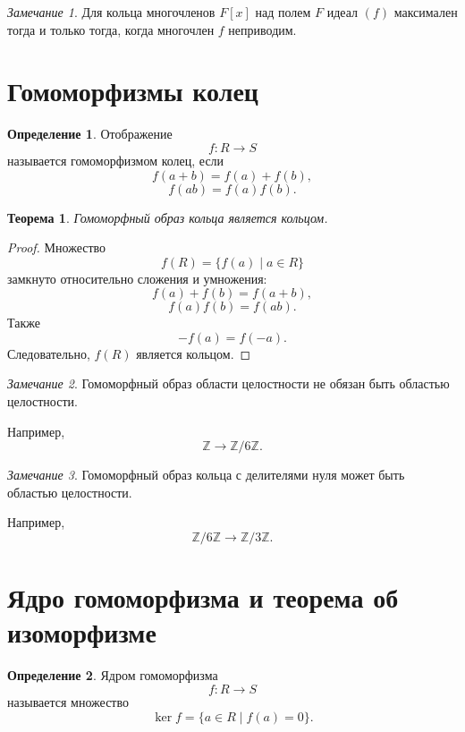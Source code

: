 \documentclass[12pt, a4paper]{article}
\newtheorem{theorem}{Теорема}
\theoremstyle{definition}
\newtheorem{definition}{Определение}
\theoremstyle{remark}
\newtheorem*{remark}{Замечание}
\newcommand{\Z}{\mathbb{Z}}
\begin{document}
\begin{remark}
	Для кольца многочленов $F[x]$ над полем $F$ идеал $(f)$ максимален тогда и только тогда, когда многочлен $f$ неприводим.
\end{remark}

\section{Гомоморфизмы колец}

\begin{definition}
	Отображение
	\[
	f:R\to S
	\]
	называется гомоморфизмом колец, если
	\[
	f(a+b)=f(a)+f(b),
	\]
	\[
	f(ab)=f(a)f(b).
	\]
\end{definition}

\begin{theorem}
	Гомоморфный образ кольца является кольцом.
\end{theorem}

\begin{proof}
	Множество
	\[
	f(R)=\{f(a)\mid a\in R\}
	\]
	замкнуто относительно сложения и умножения:
	\[
	f(a)+f(b)=f(a+b),
	\]
	\[
	f(a)f(b)=f(ab).
	\]
	Также
	\[
	-f(a)=f(-a).
	\]
	Следовательно, $f(R)$ является кольцом.
\end{proof}

\begin{remark}
	Гомоморфный образ области целостности не обязан быть областью целостности.
	
	Например,
	\[
	\Z\to \Z/6\Z.
	\]
\end{remark}

\begin{remark}
	Гомоморфный образ кольца с делителями нуля может быть областью целостности.
	
	Например,
	\[
	\Z/6\Z \to \Z/3\Z.
	\]
\end{remark}

\section{Ядро гомоморфизма и теорема об изоморфизме}

\begin{definition}
	Ядром гомоморфизма
	\[
	f:R\to S
	\]
	называется множество
	\[
	\ker f=\{a\in R\mid f(a)=0\}.
	\]
\end{definition}
\end{document}
